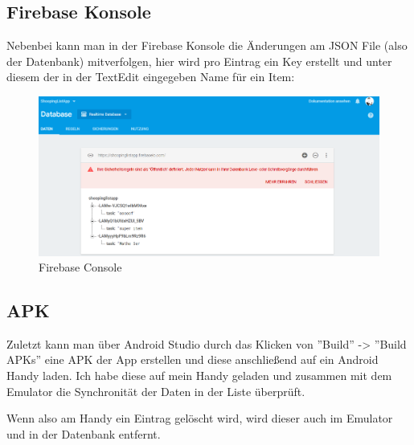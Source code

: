 \subsection{Firebase Konsole}
Nebenbei kann man in der Firebase Konsole die Änderungen am JSON File (also der Datenbank) mitverfolgen, hier wird pro Eintrag ein Key erstellt und unter diesem der in der TextEdit eingegeben Name für ein Item:
\begin{figure}[!h]
	\centering
	\includegraphics[width=0.9\linewidth]{images/firebaseconsole}
	\caption{Firebase Console}
	\label{fig:firebaseconsole}
\end{figure}

\subsection{APK}
Zuletzt kann man über Android Studio durch das Klicken von ''Build'' -> ''Build APKs'' eine APK der App erstellen und diese anschließend auf ein Android Handy laden. Ich habe diese auf mein Handy geladen und zusammen mit dem Emulator die Synchronität der Daten in der Liste überprüft. 

Wenn also am Handy ein Eintrag gelöscht wird, wird dieser auch im Emulator und in der Datenbank entfernt.





